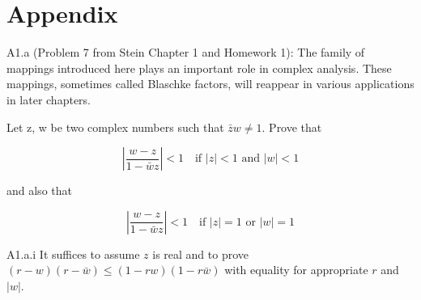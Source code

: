 \documentclass{article}
\newcommand{\abs}[1]{\left\lvert #1\right\rvert}
\begin{document}
\pagebreak

\section{Appendix}
\begin{PROB}{A1.a}\label{Problem A1.a.}
    (Problem 7 from Stein Chapter 1 and Homework 1): The family of mappings introduced here plays an important role in complex analysis. These mappings, sometimes called Blaschke factors, will reappear in various applications in later chapters.

    Let z, w be two complex numbers such that $\bar{z}w \neq 1$. Prove that

    \[\abs{\frac{w - z}{1 - \bar{w}z}} < 1 \quad \text{if $|z| < 1$ and $|w| < 1$}\] 

    and also that 

    \[\abs{\frac{w - z}{1 - \bar{w}z}} < 1 \quad \text{if $|z| = 1$ or $|w| = 1$}\]
\end{PROB}
\begin{claim}{A1.a.i}\label{Claim 3ai.}
    It suffices to assume $z$ is real and to prove $(r - w)(r - \bar{w}) \leq (1 - rw)(1 - r\bar{w})$ with equality for appropriate $r$ and $|w|$. 
\end{claim}
\end{document}
